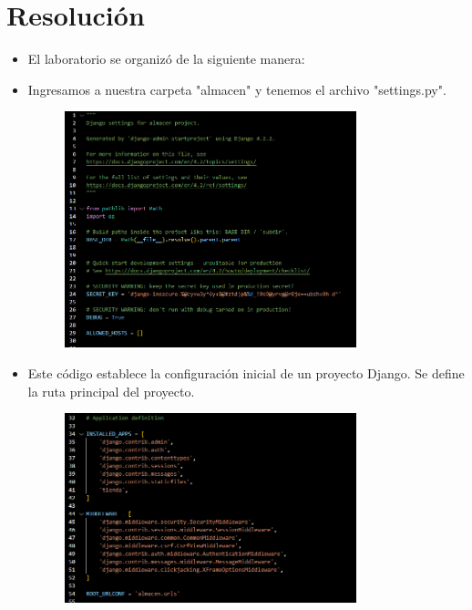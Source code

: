 \documentclass{article}
\begin{document}
	\section{Resolución}
	\begin{itemize}
 \item El laboratorio se organizó de la siguiente manera: 
  \item Ingresamos a nuestra carpeta "almacen" y tenemos el archivo "settings.py".
	\begin{figure}[H]
		\centering
		\includegraphics[width=0.8\textwidth,keepaspectratio]{Latex/img/settings1.png}
	\end{figure}
	\end{itemize}
 \begin{itemize}
 \item Este código establece la configuración inicial de un proyecto Django. Se define la ruta principal del proyecto.
	\begin{figure}[H]
		\centering
		\includegraphics[width=0.8\textwidth,keepaspectratio]{Latex/img/settings2.png}
	\end{figure}
	\end{itemize}
\end{document}
